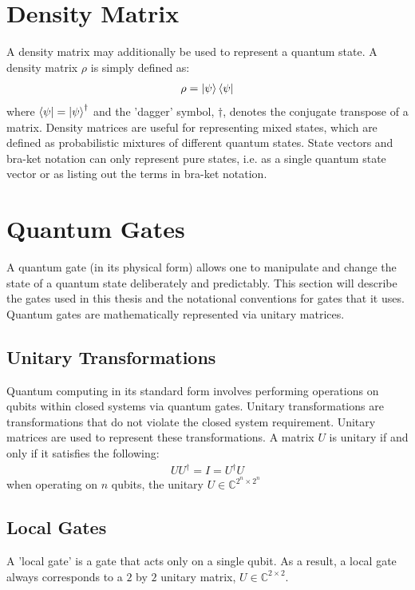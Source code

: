 \section{Density Matrix}
A density matrix may additionally be used to represent a quantum state. A density matrix $\rho$ is simply defined as:
\begin{align}
\rho = \ket{\psi} \bra{\psi}
\end{align}
where $\bra{\psi} = \ket{\psi}^{\dagger}$ and the 'dagger' symbol, $\dagger$, denotes the conjugate transpose of a matrix. Density matrices are useful for representing mixed states, which are defined as probabilistic mixtures of different quantum states. State vectors and bra-ket notation can only represent pure states, i.e. as a single quantum state vector or as listing out the terms in bra-ket notation.

\section{Quantum Gates}
A quantum gate (in its physical form) allows one to manipulate and change the state of a quantum state deliberately and predictably. This section will describe the gates used in this thesis and the notational conventions for gates that it uses. Quantum gates are mathematically represented via unitary matrices.
\subsection{Unitary Transformations}
Quantum computing in its standard form involves performing operations on qubits within closed systems via quantum gates. Unitary transformations are transformations that do not violate the closed system requirement. Unitary matrices are used to represent these transformations. A matrix $U$ is unitary if and only if it satisfies the following:
\begin{align}
UU^{\dagger} = I = U^{\dagger}U
\end{align}
when operating on $n$ qubits, the unitary $U \in \mathbb{C}^{2^n \times 2^n}$
\subsection{Local Gates}
\label{sec:localGate}
A 'local gate' is a gate that acts only on a single qubit. As a result, a local gate always corresponds to a $2$ by $2$ unitary matrix, $U \in \mathbb{C}^{2 \times 2}$.

